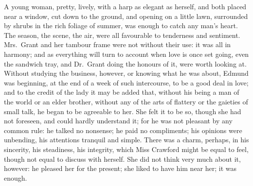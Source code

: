 \documentclass{article}
\begin{document}
A young woman, pretty, lively, with a harp as
elegant as herself, and both placed near a window,
cut down to the ground, and opening on a little lawn,
surrounded by shrubs in the rich foliage of summer,
was enough to catch any man's heart.  The season, the scene,
the air, were all favourable to tenderness and sentiment.
Mrs.\ Grant and her tambour frame were not without their use:
it was all in harmony; and as everything will turn to account
when love is once set going, even the sandwich tray,
and Dr.\ Grant doing the honours of it, were worth looking at.
Without studying the business, however, or knowing
what he was about, Edmund was beginning, at the end
of a week of such intercourse, to be a good deal in love;
and to the credit of the lady it may be added that,
without his being a man of the world or an elder brother,
without any of the arts of flattery or the gaieties of
small talk, he began to be agreeable to her.  She felt it
to be so, though she had not foreseen, and could hardly
understand it; for he was not pleasant by any common rule:
he talked no nonsense; he paid no compliments; his opinions
were unbending, his attentions tranquil and simple.
There was a charm, perhaps, in his sincerity, his steadiness,
his integrity, which Miss Crawford might be equal
to feel, though not equal to discuss with herself.
She did not think very much about it, however:  he pleased
her for the present; she liked to have him near her;
it was enough.
\end{document}
